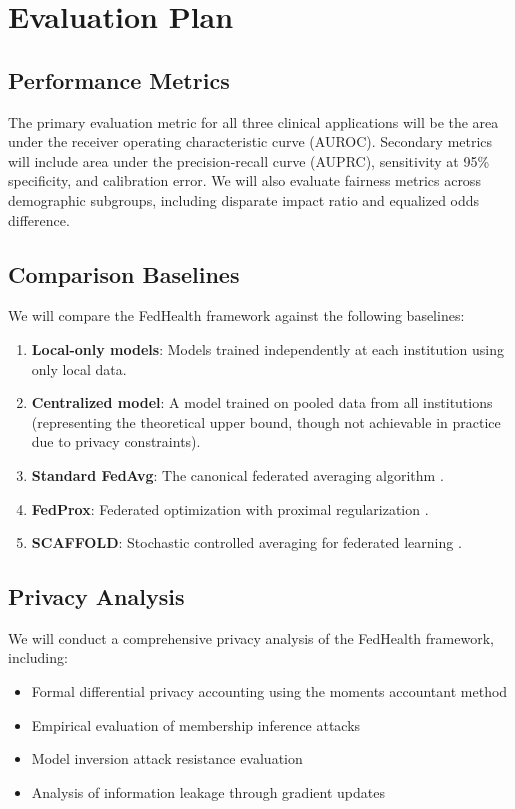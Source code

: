 \documentclass[12pt,letterpaper]{article}
\begin{document}
\section{Evaluation Plan}
\label{sec:evaluation}

\subsection{Performance Metrics}

The primary evaluation metric for all three clinical applications will be the area under the receiver operating characteristic curve (AUROC). Secondary metrics will include area under the precision-recall curve (AUPRC), sensitivity at 95\% specificity, and calibration error. We will also evaluate fairness metrics across demographic subgroups, including disparate impact ratio and equalized odds difference.

\subsection{Comparison Baselines}

We will compare the FedHealth framework against the following baselines:
\begin{enumerate}[label=(\roman*)]
  \item \textbf{Local-only models}: Models trained independently at each institution using only local data.
  \item \textbf{Centralized model}: A model trained on pooled data from all institutions (representing the theoretical upper bound, though not achievable in practice due to privacy constraints).
  \item \textbf{Standard FedAvg}: The canonical federated averaging algorithm \citep{McMahan2017}.
  \item \textbf{FedProx}: Federated optimization with proximal regularization \citep{Li2020}.
  \item \textbf{SCAFFOLD}: Stochastic controlled averaging for federated learning \citep{Karimireddy2020}.
\end{enumerate}

\subsection{Privacy Analysis}

We will conduct a comprehensive privacy analysis of the FedHealth framework, including:
\begin{itemize}
  \item Formal differential privacy accounting using the moments accountant method
  \item Empirical evaluation of membership inference attacks \citep{Shokri2017}
  \item Model inversion attack resistance evaluation
  \item Analysis of information leakage through gradient updates
\end{itemize}
\end{document}
